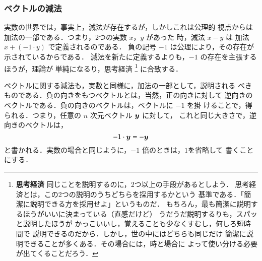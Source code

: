             \subsubsection{ベクトルの減法}
                実数の世界では，事実上，減法が存在するが，しかしこれは公理的
                視点からは加法の一部である．つまり，2つの実数 $x$，$y$ があった
                時，減法 $x-y$ は 加法 $x+(-1 \cdot y)$ で定義されるのである．
                負の記号 $-1$ は公理により，その存在が示されているからである．
                減法を新たに定義するよりも，$-1$ の存在を主張するほうが，理論が
                単純になるり，思考経済
                    \footnote{
                        \textbf{思考経済}\quad
                        同じことを説明するのに，2つ以上の手段があるとしよう．
                        思考経済とは，この2つの説明のうちどちらを採用するかという
                        基準である．「簡潔に説明できる方を採用せよ」というものだ．
                        もちろん，最も簡潔に説明するほうがいいに決まっている（直感だけど）
                        うだうだ説明するりも，スパッと説明したほうが
                        かっこいいし，覚えることも少なくすむし，何しろ短時間で
                        説明できるのだから．しかし，世の中にはどちらも同じだけ
                        簡潔に説明できることが多くある．その場合には，時と場合に
                        よって使い分ける必要が出てくることだろう．
                    }
                に合致する．

                ベクトルに関する減法も，実数と同様に，加法の一部として，説明される
                べきものである．負の向きをもつベクトルとは，当然，正の向きに対して
                逆向きのベクトルである．負の向きのベクトルは，ベクトルに $-1$ を掛
                けることで，得られる．つまり，任意の $n$ 次元ベクトル $\boldsymbol{y}$ に対して，
                これと同じ大きさで，逆向きのベクトルは，
                \begin{equation*}
                    -1 \cdot \boldsymbol{y} = -\boldsymbol{y}
                \end{equation*}
                と書かれる．実数の場合と同じように，$-1$ 倍のときは，$1$を省略して
                書くことにする．

